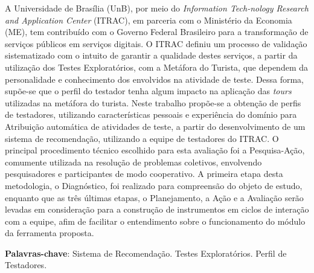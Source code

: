\begin{resumo}

A Universidade de Brasília (UnB), por meio do \textit{Information Tech-nology Research and Application Center} (ITRAC), em parceria com o Ministério da Economia (ME), tem contribuído com o Governo Federal Brasileiro para a transformação de serviços públicos em serviços digitais. O ITRAC definiu um processo de validação sistematizado com o intuito de garantir a qualidade destes serviços, a partir da utilização dos Testes Exploratórios, com a Metáfora do Turista, que dependem da personalidade e conhecimento dos envolvidos na atividade de teste. Dessa forma, supõe-se que o perfil do testador tenha algum impacto na aplicação das \textit{tours} utilizadas na metáfora do turista. Neste trabalho propõe-se a obtenção de perfis de testadores, utilizando características pessoais e experiência do domínio para Atribuição automática de atividades de teste, a partir do desenvolvimento de um sistema de recomendação, utilizando a equipe de testadores do ITRAC. O principal procedimento técnico escolhido para esta avaliação foi a Pesquisa-Ação, comumente utilizada na resolução de problemas coletivos, envolvendo pesquisadores e participantes de modo cooperativo. A primeira etapa desta metodologia, o Diagnóstico, foi realizado para compreensão do objeto de estudo, enquanto que as três últimas etapas, o Planejamento, a Ação e a Avaliação serão levadas em consideração para a construção de instrumentos em ciclos de interação com a equipe, afim de facilitar o entendimento sobre o funcionamento do módulo da ferramenta proposta.

 \vspace{\onelineskip}

 \noindent
 \textbf{Palavras-chave}: Sistema de Recomendação. Testes Exploratórios. Perfil de Testadores.
\end{resumo}
